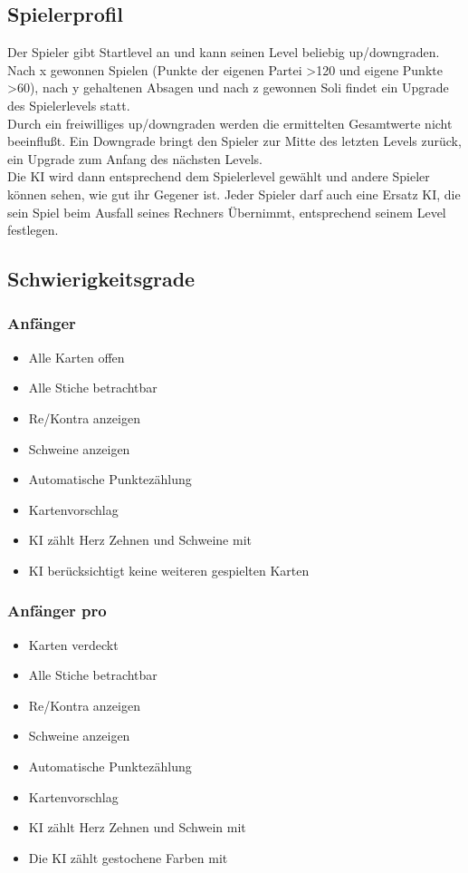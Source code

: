 \documentclass[12pt,a4paper]{article}
\begin{document}
\subsection{Spielerprofil}
Der Spieler gibt Startlevel an und kann seinen Level beliebig up/downgraden.\\
Nach x gewonnen Spielen (Punkte der eigenen Partei \textgreater 120 und eigene Punkte \textgreater 60), nach y gehaltenen Absagen
und nach z gewonnen Soli findet ein Upgrade des Spielerlevels statt.\\
Durch ein freiwilliges up/downgraden werden die ermittelten Gesamtwerte nicht beeinflußt.
Ein Downgrade bringt den Spieler zur Mitte des letzten Levels zurück, ein Upgrade zum Anfang des nächsten Levels.\\
Die KI wird dann entsprechend dem Spielerlevel gewählt und andere Spieler können sehen, wie gut ihr Gegener ist.
Jeder Spieler darf auch eine Ersatz KI, die sein Spiel beim Ausfall seines Rechners Übernimmt, entsprechend seinem
Level festlegen.
\subsection{Schwierigkeitsgrade}
\subsubsection{Anfänger}
\begin{itemize}
\item Alle Karten offen
\item Alle Stiche betrachtbar
\item Re/Kontra anzeigen
\item Schweine anzeigen
\item Automatische Punktezählung
\item Kartenvorschlag
\item KI zählt Herz Zehnen und Schweine mit
\item KI berücksichtigt keine weiteren gespielten Karten
\end{itemize}
\subsubsection{Anfänger pro}
\begin{itemize}
\item Karten verdeckt
\item Alle Stiche betrachtbar
\item Re/Kontra anzeigen
\item Schweine anzeigen
\item Automatische Punktezählung
\item Kartenvorschlag
\item KI zählt Herz Zehnen und Schwein mit
\item Die KI zählt gestochene Farben mit
\end{itemize}
\end{document}

